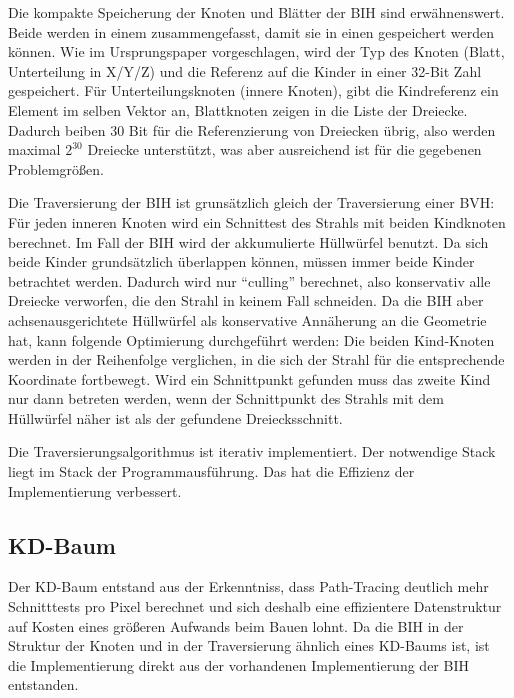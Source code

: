 Die kompakte Speicherung der Knoten und Blätter der BIH sind erwähnenswert. Beide werden in einem  zusammengefasst, damit sie in einen  gespeichert werden können. Wie im Ursprungspaper vorgeschlagen, wird der Typ des Knoten (Blatt, Unterteilung in X/Y/Z) und die Referenz auf die Kinder in einer 32-Bit Zahl gespeichert. Für Unterteilungsknoten (innere Knoten), gibt die Kindreferenz ein Element im selben Vektor an, Blattknoten zeigen in die Liste der Dreiecke. Dadurch beiben 30 Bit für die Referenzierung von Dreiecken übrig, also werden maximal $2^{30}$ Dreiecke unterstützt, was aber ausreichend ist für die gegebenen Problemgrößen.

Die Traversierung der BIH ist grunsätzlich gleich der Traversierung einer BVH: Für jeden inneren Knoten wird ein Schnittest des Strahls mit beiden Kindknoten berechnet. Im Fall der BIH wird der akkumulierte Hüllwürfel benutzt. Da sich beide Kinder grundsätzlich überlappen können, müssen immer beide Kinder betrachtet werden. Dadurch wird nur "`culling"' berechnet, also konservativ alle Dreiecke verworfen, die den Strahl in keinem Fall schneiden. Da die BIH aber achsenausgerichtete Hüllwürfel als konservative Annäherung an die Geometrie hat, kann folgende Optimierung durchgeführt werden: Die beiden Kind-Knoten werden in der Reihenfolge verglichen, in die sich der Strahl für die entsprechende Koordinate fortbewegt. Wird ein Schnittpunkt gefunden muss das zweite Kind nur dann betreten werden, wenn der Schnittpunkt des Strahls mit dem Hüllwürfel näher ist als der gefundene Dreiecksschnitt.

Die Traversierungsalgorithmus ist iterativ implementiert. Der notwendige Stack liegt im Stack der Programmausführung. Das hat die Effizienz der Implementierung verbessert.

\subsection{KD-Baum}
\label{ssec:kdtree}

Der KD-Baum entstand aus der Erkenntniss, dass Path-Tracing deutlich mehr Schnitttests pro Pixel berechnet und sich deshalb eine effizientere Datenstruktur auf Kosten eines größeren Aufwands beim Bauen lohnt. Da die BIH in der Struktur der Knoten und in der Traversierung ähnlich eines KD-Baums ist, ist die Implementierung direkt aus der vorhandenen Implementierung der BIH entstanden.

